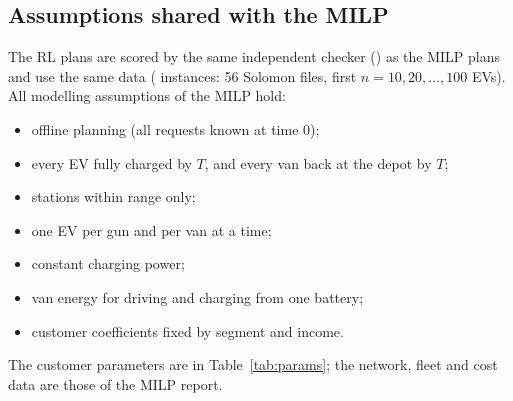 \subsection{Assumptions shared with the MILP}
The RL plans are scored by the same independent checker () as the MILP plans and use the same data (\NInst{} instances: 56 Solomon files, first $n=10,20,\dots,100$ EVs). All modelling assumptions of the MILP hold:
\begin{itemize}
  \item offline planning (all requests known at time 0);
  \item every EV fully charged by $T$, and every van back at the depot by $T$;
  \item stations within range only;
  \item one EV per gun and per van at a time;
  \item constant charging power;
  \item van energy for driving and charging from one battery;
  \item customer coefficients fixed by segment and income.
\end{itemize}
The customer parameters are in Table~\ref{tab:params}; the network, fleet and cost data are those of the MILP report.

\begin{table}[H]\centering\small
\caption{Customer parameters of the run (straight lines between $\theta=0$ and $\theta=1$, per segment). Commercial: $c^{\mathrm D}=c^{\mathrm C}=c^{\mathrm V}=\omega$.}\label{tab:params}

\end{table}

